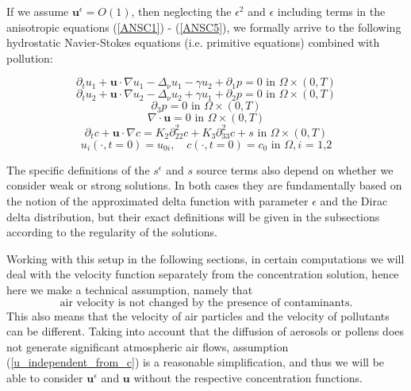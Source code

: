 \documentclass[11pt, a4paper]{article}
\begin{document}
If we assume $\mathbf{u}^\epsilon = O(1)$, then neglecting the $\epsilon^2$ and $\epsilon$ including terms in the anisotropic equations (\ref{ANSC1}) - (\ref{ANSC5}), we formally arrive to the following hydrostatic Navier-Stokes equations (i.e. primitive equations) combined with pollution:

\begin{equation} \label{HNSC1}
\partial_t u_1 + \mathbf{u} \cdot \nabla u_1 - \Delta_\nu u_1 -\gamma u_2 + \partial_1 p = 0 \text{ in } \Omega \times (0,T)
\end{equation}
%
\begin{equation} \label{HNSC2}
\partial_t u_2 + \mathbf{u} \cdot \nabla u_2 - \Delta_\nu u_2 + \gamma u_1 + \partial_2 p = 0 \text{ in } \Omega \times (0,T)
\end{equation}
%
\begin{equation} \label{HNSC3}
\partial_3 p = 0 \text{ in } \Omega \times (0,T)
\end{equation}
%
\begin{equation} \label{HNSC4}
\nabla \cdot \mathbf{u} = 0 \text{ in } \Omega \times (0,T)
\end{equation}
%
\begin{equation} \label{HNSC5}
\partial_t c + \mathbf{u} \cdot \nabla c = K_2 \partial_{22} ^ 2 c + K_3 \partial_{33} ^2 c + s \text{ in } \Omega \times (0,T)
\end{equation}
%
\begin{equation} \label{HNSC_init}
u_i (\cdot, t=0) = u_{0 i}, \quad c (\cdot, t=0) = c_0 \text{ in } \Omega, \text{$i$ = 1,2}
\end{equation}

The specific definitions of the $s^\epsilon$ and $s$ source terms also depend on whether we consider weak or strong solutions. In both cases they are fundamentally based on the notion of the approximated delta function with parameter $\epsilon$ and the Dirac delta distribution, but their exact definitions will be given in the subsections according to the regularity of the solutions.

Working with this setup in the following sections, in certain computations we will deal with the velocity function separately from the concentration solution, hence here we make a technical assumption, namely that
\begin{equation}\label{u_independent_from_c}\text{air velocity is not changed by the presence of contaminants.}\end{equation}
This also means that the velocity of air particles and the velocity of pollutants can be different. Taking into account that the diffusion of aerosols or pollens does not generate significant atmospheric air flows, assumption (\ref{u_independent_from_c}) is a reasonable simplification, and thus we will be able to consider $\mathbf{u}^\epsilon$ and $\mathbf{u}$ without the respective concentration functions.
\end{document}
